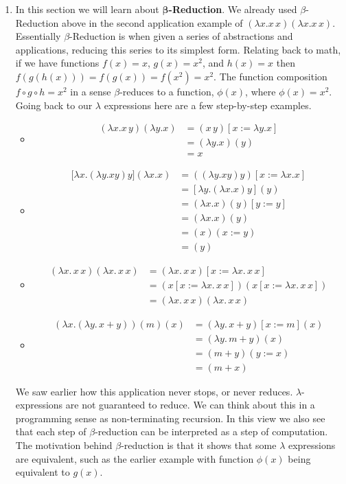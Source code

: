 \documentclass[12pt]{article}
\begin{document}
\begin{enumerate}
\item In this section we will learn about $\boldsymbol{\beta}$\textbf{-Reduction}. We already used $\beta$-Reduction above in the second application example of $(\lambda x.x\,x) (\lambda x.x\,x)$. Essentially $\beta$-Reduction is when given a series of abstractions and applications, reducing this series to its simplest form. Relating back to math, if we have functions $f(x) = x$, $g(x) = x^2$, and $h(x) = x$ then $f(g(h(x))) = f(g(x)) = f(x^2) = x^2$. The function composition $f\circ g \circ h = x^2$ in a sense $\beta$-reduces to a function, $\phi(x)$, where $\phi(x) = x^2$. Going back to our $\lambda$ expressions here are a few step-by-step examples.
\begin{itemize}
\item 
	\begin{align*}
	(\lambda x. x\,y)(\lambda y.x) &= ( x\,y)[x:=\lambda y.x]
	\\
 	&= (\lambda y.x)(y)\\
 	&= x
	\end{align*}
\item 
	\begin{align*}
	\big[\lambda x. (\lambda y. x y) y\big]			(\lambda x.x) &= ((\lambda y. x 		y) y)[x:= \lambda x.x]\\
 	&= [\lambda y.(\lambda x.x)y](y)\\
 	&= (\lambda x.x)(y)[y:=y]\\
 	&= (\lambda x.x)(y)\\
 	&= (x)(x:=y)\\
 	&= (y)
\end{align*}
\item 
\begin{align*}
	(\lambda x.\,x\, x) (\lambda x.\,x\,x) &= 			(\lambda x.\,x\,x)[x:=\lambda x.\,x\,x]\\
	&= (x[x:= \lambda x.\,x\,x])(x[x:=\lambda 			x.\,x\,x]) \\
 	&= (\lambda x.\,x\,x)(\lambda x.\,x\,x)
	\end{align*}
\item 
\begin{align*}
	(\lambda x.(\lambda y.\,x+y))(m)(x) &= 			(\lambda y.\,x+y)[x:=m](x) \\
	&= (\lambda y. \, m + y)(x)\\
	&= (m+y)(y:=x)\\
	&= (m + x)
\end{align*}
\end{itemize}
We saw earlier how this application never stops, or never reduces. $\lambda$-expressions are not guaranteed to reduce. We can think about this in a programming sense as non-terminating recursion. In this view we also see that each step of $\beta$-reduction can be interpreted as a step of computation. The motivation behind $\beta$-reduction is that it shows that some $\lambda$ expressions are equivalent, such as the earlier example with function $\phi(x)$ being equivalent to $g(x)$.

\end{enumerate}
\end{document}
